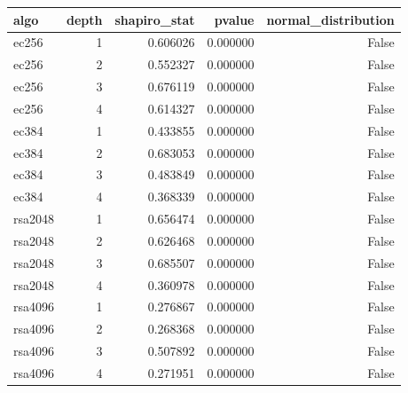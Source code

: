 \begin{tabular}{lrrrr}
\toprule
algo & depth & shapiro_stat & pvalue & normal_distribution \\
\midrule
ec256 & 1 & 0.606026 & 0.000000 & False \\
ec256 & 2 & 0.552327 & 0.000000 & False \\
ec256 & 3 & 0.676119 & 0.000000 & False \\
ec256 & 4 & 0.614327 & 0.000000 & False \\
ec384 & 1 & 0.433855 & 0.000000 & False \\
ec384 & 2 & 0.683053 & 0.000000 & False \\
ec384 & 3 & 0.483849 & 0.000000 & False \\
ec384 & 4 & 0.368339 & 0.000000 & False \\
rsa2048 & 1 & 0.656474 & 0.000000 & False \\
rsa2048 & 2 & 0.626468 & 0.000000 & False \\
rsa2048 & 3 & 0.685507 & 0.000000 & False \\
rsa2048 & 4 & 0.360978 & 0.000000 & False \\
rsa4096 & 1 & 0.276867 & 0.000000 & False \\
rsa4096 & 2 & 0.268368 & 0.000000 & False \\
rsa4096 & 3 & 0.507892 & 0.000000 & False \\
rsa4096 & 4 & 0.271951 & 0.000000 & False \\
\bottomrule
\end{tabular}
